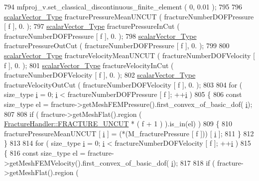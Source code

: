 \begin{DoxyCode}
794         mfproj\_v.set\_classical\_discontinuous\_finite\_element ( 0, 0.01 );
795 
796         \hyperlink{Core_8h_a4e75b5863535ba1dd79942de2846eff0}{scalarVector\_Type} fracturePressureMeanUNCUT ( fractureNumberDOFPressure [ f ], 0. 
      );
797         \hyperlink{Core_8h_a4e75b5863535ba1dd79942de2846eff0}{scalarVector\_Type} fracturePressureInCut ( fractureNumberDOFPressure [ f ], 0. );
798         \hyperlink{Core_8h_a4e75b5863535ba1dd79942de2846eff0}{scalarVector\_Type} fracturePressureOutCut ( fractureNumberDOFPressure [ f ], 0. );
799 
800         \hyperlink{Core_8h_a4e75b5863535ba1dd79942de2846eff0}{scalarVector\_Type} fractureVelocityMeanUNCUT ( fractureNumberDOFVelocity [ f ], 0. 
      );
801         \hyperlink{Core_8h_a4e75b5863535ba1dd79942de2846eff0}{scalarVector\_Type} fractureVelocityInCut ( fractureNumberDOFVelocity [ f ], 0. );
802         \hyperlink{Core_8h_a4e75b5863535ba1dd79942de2846eff0}{scalarVector\_Type} fractureVelocityOutCut ( fractureNumberDOFVelocity [ f ], 0. );
803 
804         \textcolor{keywordflow}{for} ( size\_type \hyperlink{matrici_8m_a6f6ccfcf58b31cb6412107d9d5281426}{i} = 0; \hyperlink{matrici_8m_a6f6ccfcf58b31cb6412107d9d5281426}{i} < fractureNumberDOFPressure [ f ]; ++\hyperlink{matrici_8m_a6f6ccfcf58b31cb6412107d9d5281426}{i} )
805         \{
806             \textcolor{keyword}{const} size\_type el =  fracture->getMeshFEMPressure().first\_convex\_of\_basic\_dof(
      \hyperlink{matrici_8m_a6f6ccfcf58b31cb6412107d9d5281426}{i});
807         
808             \textcolor{keywordflow}{if} ( fracture->getMeshFlat().region ( 
      \hyperlink{classFractureHandler_a495ad4fc72d0c47c8f0424842f1153aaaa992cc3ad024a030ecd798dc319c95ac}{FractureHandler::FRACTURE\_UNCUT} * ( f + 1 ) ).is\_in(el) )
809             \{   
810                 fracturePressureMeanUNCUT [ \hyperlink{matrici_8m_a6f6ccfcf58b31cb6412107d9d5281426}{i} ] = (*(M\_fracturePressure [ f ])) [ 
      \hyperlink{matrici_8m_a6f6ccfcf58b31cb6412107d9d5281426}{i} ];
811             \}
812         \}
813 
814         \textcolor{keywordflow}{for} ( size\_type \hyperlink{matrici_8m_a6f6ccfcf58b31cb6412107d9d5281426}{i} = 0; \hyperlink{matrici_8m_a6f6ccfcf58b31cb6412107d9d5281426}{i} < fractureNumberDOFVelocity [ f ]; ++\hyperlink{matrici_8m_a6f6ccfcf58b31cb6412107d9d5281426}{i} )
815         \{
816             \textcolor{keyword}{const} size\_type el =  fracture->getMeshFEMVelocity().first\_convex\_of\_basic\_dof(
      \hyperlink{matrici_8m_a6f6ccfcf58b31cb6412107d9d5281426}{i});
817         
818             \textcolor{keywordflow}{if} ( fracture->getMeshFlat().region ( 

\end{DoxyCode}
